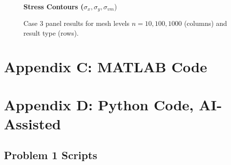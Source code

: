 \documentclass{article}
\begin{document}
\begin{figure}[htbp]
\vspace{0.5em}
\textbf{Stress Contours ($\sigma_x, \sigma_y, \sigma_{vm}$})

\caption{Case 3 panel results for mesh levels $n=10,100,1000$ (columns) and result type (rows).}
\end{figure}


\clearpage
\appendix
\label{sec:appC}
\section*{Appendix C: MATLAB Code}



\clearpage


\clearpage


\clearpage
\appendix
\section*{Appendix D: Python Code, AI-Assisted}
\label{sec:appD}
\subsection*{Problem 1 Scripts}



\clearpage


\clearpage

\end{document}
